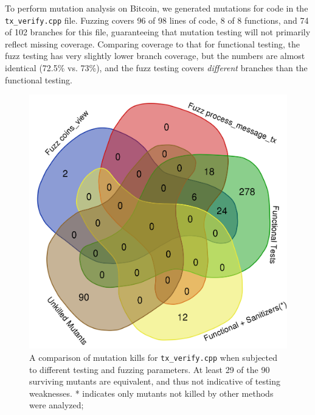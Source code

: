 \begin{sloppypar}

To perform mutation analysis on Bitcoin, we generated mutations for code in the
{\tt tx\_verify.cpp} file.  Fuzzing covers 96 of 98 lines of code, 8
of 8 functions, and 74 of 102 branches for this file, guaranteeing
that mutation testing will not primarily reflect missing coverage.
Comparing coverage to that for functional testing, the fuzz testing
has very slightly lower branch coverage, but the numbers are almost
identical (72.5\% vs. 73\%), and the fuzz testing covers \emph{different} branches than
the functional testing.  

\begin{figure}
\vspace{2mm}
\includegraphics[width=0.9\columnwidth]{kill_pre_valgrind.png}
\caption{A comparison of mutation kills for {\tt tx\_verify.cpp} when
  subjected to different testing and fuzzing parameters.  At least 29
  of the 90 surviving mutants are equivalent, and thus not indicative
  of testing weaknesses.  * indicates
  only mutants not killed by other methods were analyzed;}
\label{kills}
\end{figure}





\end{sloppypar}
